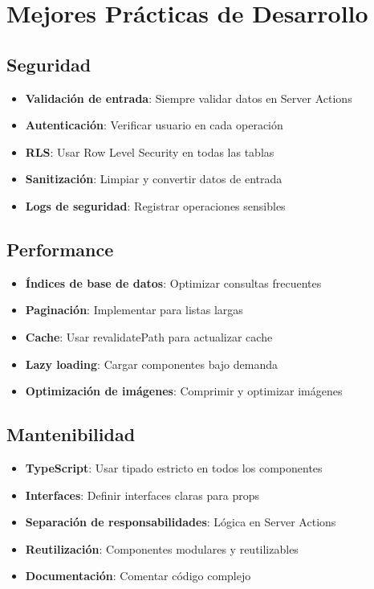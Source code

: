 \documentclass[12pt,a4paper]{article}
\begin{document}
\section{Mejores Prácticas de Desarrollo}

\subsection{Seguridad}

\begin{itemize}
    \item \textbf{Validación de entrada}: Siempre validar datos en Server Actions
    \item \textbf{Autenticación}: Verificar usuario en cada operación
    \item \textbf{RLS}: Usar Row Level Security en todas las tablas
    \item \textbf{Sanitización}: Limpiar y convertir datos de entrada
    \item \textbf{Logs de seguridad}: Registrar operaciones sensibles
\end{itemize}

\subsection{Performance}

\begin{itemize}
    \item \textbf{Índices de base de datos}: Optimizar consultas frecuentes
    \item \textbf{Paginación}: Implementar para listas largas
    \item \textbf{Cache}: Usar revalidatePath para actualizar cache
    \item \textbf{Lazy loading}: Cargar componentes bajo demanda
    \item \textbf{Optimización de imágenes}: Comprimir y optimizar imágenes
\end{itemize}

\subsection{Mantenibilidad}

\begin{itemize}
    \item \textbf{TypeScript}: Usar tipado estricto en todos los componentes
    \item \textbf{Interfaces}: Definir interfaces claras para props
    \item \textbf{Separación de responsabilidades}: Lógica en Server Actions
    \item \textbf{Reutilización}: Componentes modulares y reutilizables
    \item \textbf{Documentación}: Comentar código complejo
\end{itemize}
\end{document}
